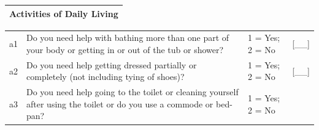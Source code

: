 \documentclass[12pt,a4paper]{book}
\theoremstyle{definition}
\theoremstyle{definition}
\theoremstyle{definition}
\theoremstyle{remark}
\begin{document}
\begin{longtable}[]{@{}c@{}}
\toprule
\begin{minipage}[t]{0.97\columnwidth}\centering
\textbf{Activities of Daily Living}\strut
\end{minipage}\tabularnewline
\bottomrule
\end{longtable}

\begin{longtable}[]{@{}llll@{}}
\toprule
\begin{minipage}[t]{0.09\columnwidth}\raggedright
a1\strut
\end{minipage} & \begin{minipage}[t]{0.41\columnwidth}\raggedright
Do you need help with bathing more than one part of your body or getting
in or out of the tub or shower?\strut
\end{minipage} & \begin{minipage}[t]{0.25\columnwidth}\raggedright
1 = Yes; 2 = No\strut
\end{minipage} & \begin{minipage}[t]{0.13\columnwidth}\raggedright
{[}\_\_{]}\strut
\end{minipage}\tabularnewline
\begin{minipage}[t]{0.09\columnwidth}\raggedright
a2\strut
\end{minipage} & \begin{minipage}[t]{0.41\columnwidth}\raggedright
Do you need help getting dressed partially or completely (not including
tying of shoes)?\strut
\end{minipage} & \begin{minipage}[t]{0.25\columnwidth}\raggedright
1 = Yes; 2 = No\strut
\end{minipage} & \begin{minipage}[t]{0.13\columnwidth}\raggedright
{[}\_\_{]}\strut
\end{minipage}\tabularnewline
\begin{minipage}[t]{0.09\columnwidth}\raggedright
a3\strut
\end{minipage} & \begin{minipage}[t]{0.41\columnwidth}\raggedright
Do you need help going to the toilet or cleaning yourself after using
the toilet or do you use a commode or bed-pan?\strut
\end{minipage} & \begin{minipage}[t]{0.25\columnwidth}\raggedright
1 = Yes; 2 = No\strut
\end{minipage} & \begin{minipage}[t]{0.13\columnwidth}\raggedright

\end{minipage}
\end{longtable}
\end{document}

